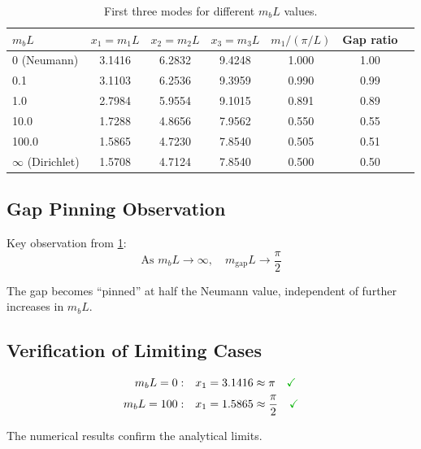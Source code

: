 \documentclass[11pt,a4paper]{article}
\newcommand{\mgap}{m_{\mathrm{gap}}}
\newcommand{\mb}{m_b}
\newcommand{\emark}{\textcolor{green!70!black}{\checkmark}}
\theoremstyle{definition}
\theoremstyle{plain}
\theoremstyle{remark}
\begin{document}
\begin{table}[htbp]
\centering
\caption{First three modes for different $\mb L$ values.}
\label{tab:numerical-modes}
\begin{tabular}{@{}lcccccc@{}}
\toprule
$\mb L$ & $x_1 = m_1 L$ & $x_2 = m_2 L$ & $x_3 = m_3 L$ & $m_1/(\pi/L)$ & Gap ratio \\
\midrule
0 (Neumann) & 3.1416 & 6.2832 & 9.4248 & 1.000 & 1.00 \\
0.1 & 3.1103 & 6.2536 & 9.3959 & 0.990 & 0.99 \\
1.0 & 2.7984 & 5.9554 & 9.1015 & 0.891 & 0.89 \\
10.0 & 1.7288 & 4.8656 & 7.9562 & 0.550 & 0.55 \\
100.0 & 1.5865 & 4.7230 & 7.8540 & 0.505 & 0.51 \\
$\infty$ (Dirichlet) & 1.5708 & 4.7124 & 7.8540 & 0.500 & 0.50 \\
\bottomrule
\end{tabular}
\end{table}

\subsection{Gap Pinning Observation}

Key observation from \cref{tab:numerical-modes}:
\begin{equation}
\boxed{\text{As } \mb L \to \infty, \quad \mgap L \to \frac{\pi}{2}}
\label{eq:pinning}
\end{equation}

The gap becomes ``pinned'' at half the Neumann value, independent of further
increases in $\mb L$.

\subsection{Verification of Limiting Cases}

\begin{align}
\mb L = 0: &\quad x_1 = 3.1416 \approx \pi \quad \emark \label{eq:verify-0} \\
\mb L = 100: &\quad x_1 = 1.5865 \approx \frac{\pi}{2} \quad \emark \label{eq:verify-100}
\end{align}

The numerical results confirm the analytical limits.

\end{document}
